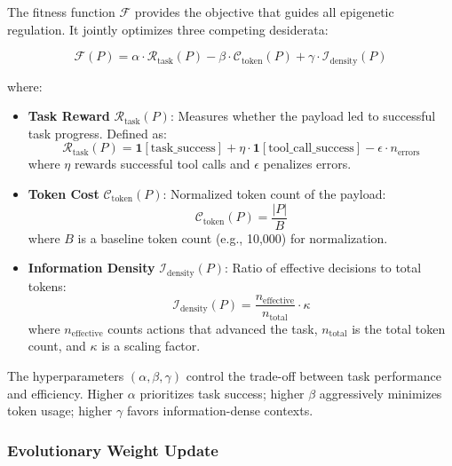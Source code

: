 The fitness function $\mathcal{F}$ provides the objective that guides all epigenetic regulation. It jointly optimizes three competing desiderata:

\begin{equation}
    \mathcal{F}(P) = \alpha \cdot \mathcal{R}_{\text{task}}(P) - \beta \cdot \mathcal{C}_{\text{token}}(P) + \gamma \cdot \mathcal{I}_{\text{density}}(P)
    \label{eq:fitness}
\end{equation}

where:

\begin{itemize}
    \item \textbf{Task Reward} $\mathcal{R}_{\text{task}}(P)$: Measures whether the payload led to successful task progress. Defined as:
    \begin{equation}
        \mathcal{R}_{\text{task}}(P) = \mathbf{1}[\text{task\_success}] + \eta \cdot \mathbf{1}[\text{tool\_call\_success}] - \epsilon \cdot n_{\text{errors}}
    \end{equation}
    where $\eta$ rewards successful tool calls and $\epsilon$ penalizes errors.
    
    \item \textbf{Token Cost} $\mathcal{C}_{\text{token}}(P)$: Normalized token count of the payload:
    \begin{equation}
        \mathcal{C}_{\text{token}}(P) = \frac{|P|}{B}
    \end{equation}
    where $B$ is a baseline token count (e.g., 10,000) for normalization.
    
    \item \textbf{Information Density} $\mathcal{I}_{\text{density}}(P)$: Ratio of effective decisions to total tokens:
    \begin{equation}
        \mathcal{I}_{\text{density}}(P) = \frac{n_{\text{effective}}}{n_{\text{total}}} \cdot \kappa
    \end{equation}
    where $n_{\text{effective}}$ counts actions that advanced the task, $n_{\text{total}}$ is the total token count, and $\kappa$ is a scaling factor.
\end{itemize}

The hyperparameters $(\alpha, \beta, \gamma)$ control the trade-off between task performance and efficiency. Higher $\alpha$ prioritizes task success; higher $\beta$ aggressively minimizes token usage; higher $\gamma$ favors information-dense contexts.

\subsubsection{Evolutionary Weight Update}


